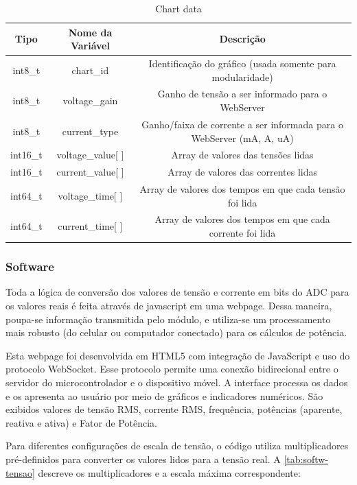 \begin{table}[h!]
\centering
\caption{Chart data}
\begin{tabular}{|c|c|c|}
    \hline
    \textbf{Tipo} & \textbf{Nome da Variável} & \textbf{Descrição} \\ \hline
    int8\_t & chart\_id & Identificação do gráfico (usada somente para modularidade) \\ \hline
    int8\_t & voltage\_gain & Ganho de tensão a ser informado para o WebServer \\ \hline
    int8\_t & current\_type & Ganho/faixa de corrente a ser informada para o WebServer (mA, A, uA) \\ \hline
    int16\_t & voltage\_value[ ] & Array de valores das tensões lidas \\ \hline
    int16\_t & current\_value[ ] & Array de valores das correntes lidas \\ \hline
    int64\_t & voltage\_time[ ] & Array de valores dos tempos em que cada tensão foi lida \\ \hline
    int64\_t & current\_time[ ] & Array de valores dos tempos em que cada corrente foi lida \\ \hline
\end{tabular}
\label{tab:struct-graph}
\end{table}

\subsubsection{Software}\label{softwa}

Toda a lógica de conversão dos valores de tensão e corrente em bits do \gls{ADC} para os valores reais é feita através de javascript em uma webpage. Dessa maneira, poupa-se informação transmitida pelo módulo, e utiliza-se um processamento mais robusto (do celular ou computador conectado) para os cálculos de potência.

Esta webpage foi desenvolvida em HTML5 com integração de JavaScript e uso do protocolo WebSocket. Esse protocolo permite uma conexão bidirecional entre o servidor do microcontrolador e o dispositivo móvel. A interface processa os dados e os apresenta ao usuário por meio de gráficos e indicadores numéricos. São exibidos valores de tensão RMS, corrente RMS, frequência, potências (aparente, reativa e ativa) e Fator de Potência.

Para diferentes configurações de escala de tensão, o código utiliza multiplicadores pré-definidos para converter os valores lidos para a tensão real. A \autoref{tab:softw-tensao} descreve os multiplicadores e a escala máxima correspondente:

